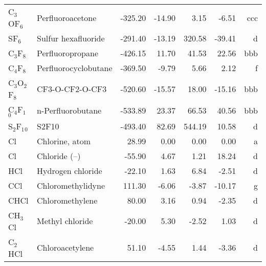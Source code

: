 \begin{table}
\begin{center}
\begin{tabular}{llrrrrr}
 C$_3$OF$_6$       & Perfluoroacetone                &  -325.20    &   -14.90  &     3.15  &    -6.51  &    ccc\\
 SF$_6$         & Sulfur hexafluoride             &  -291.40    &   -13.19  &   320.58  &   -39.41  &      d\\
 C$_3$F$_8$        & Perfluoropropane                &  -426.15    &    11.70  &    41.53  &    22.56  &    bbb\\
 C$_4$F$_8$        & Perfluorocyclobutane            &  -369.50    &    -9.79  &     5.66  &     2.12  &      f\\
 C$_3$O$_2$F$_8$      & CF3-O-CF2-O-CF3                       &  -520.60    &   -15.57  &    18.00  &   -15.16  &    bbb\\
 C$_4$F$_1$$_0$       & n-Perfluorobutane               &  -533.89    &    23.37  &    66.53  &    40.56  &    bbb\\
 S$_2$F$_1$$_0$       & S2F10                           &  -493.40    &    82.69  &   544.19  &    10.58  &      d\\
 Cl          & Chlorine, atom                  &    28.99    &     0.00  &     0.00  &     0.00  &      a\\
 Cl          & Chloride (--)                    &   -55.90    &     4.67  &     1.21  &    18.24  &      d\\
 HCl         & Hydrogen chloride               &   -22.10    &     1.63  &     6.84  &    -2.51  &      d\\
 CCl         & Chloromethylidyne               &   111.30    &    -6.06  &    -3.87  &   -10.17  &      g\\
 CHCl        & Chloromethylene                 &    80.00    &     3.16  &     0.94  &    -2.35  &      d\\
 CH$_3$Cl       & Methyl chloride                 &   -20.00    &     5.30  &    -2.52  &     1.03  &      d\\
 C$_2$HCl       & Chloroacetylene                 &    51.10    &    -4.55  &     1.44  &    -3.36  &      d\\
\hline
\end{tabular}
\end{center}
\end{table}
\clearpage

